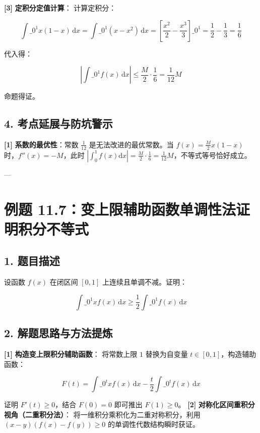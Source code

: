 \documentclass[11pt,a4paper,UTF8]{ctexart}
\begin{document}
\begin{solbox}[分步推导与答题规范]
\textbf{[3]}  \textbf{定积分定值计算}：
计算定积分：

\begin{equation*}
\int\_0^1 x(1-x)\,\mathrm{d}x = \int\_0^1 (x - x^2)\,\mathrm{d}x = \left[ \frac{x^2}{2} - \frac{x^3}{3} \right]\_0^1 = \frac{1}{2} - \frac{1}{3} = \frac{1}{6}
\end{equation*}

代入得：

\begin{equation*}
\left| \int\_0^1 f(x)\,\mathrm{d}x \right| \le \frac{M}{2} \cdot \frac{1}{6} = \frac{1}{12}M
\end{equation*}

命题得证。
\end{solbox}


\subsection{4. 考点延展与防坑警示}
\begin{solbox}[分步推导与答题规范]
\textbf{[1]}  \textbf{系数的最优性}：常数 $\frac{1}{12}$ 是无法改进的最优常数。当 $f(x) = \frac{M}{2}x(1-x)$ 时，$f''(x) = -M$，此时 $|\int_0^1 f(x)\mathrm{d}x| = \frac{M}{2} \cdot \frac{1}{6} = \frac{1}{12}M$，不等式等号恰好成立。
\end{solbox}

---


\section{例题 11.7：变上限辅助函数单调性法证明积分不等式}


\subsection{1. 题目描述}
设函数 $f(x)$ 在闭区间 $[0, 1]$ 上连续且单调不减。证明：

\begin{equation*}
\int\_0^1 x f(x)\,\mathrm{d}x \ge \frac{1}{2}\int\_0^1 f(x)\,\mathrm{d}x
\end{equation*}



\subsection{2. 解题思路与方法提炼}
\begin{solbox}[分步推导与答题规范]
\textbf{[1]}  \textbf{构造变上限积分辅助函数}：
将常数上限 $1$ 替换为自变量 $t \in [0, 1]$，构造辅助函数：

\begin{equation*}
F(t) = \int\_0^t x f(x)\,\mathrm{d}x - \frac{t}{2}\int\_0^t f(x)\,\mathrm{d}x
\end{equation*}

证明 $F'(t) \ge 0$，结合 $F(0)=0$ 即可推出 $F(1) \ge 0$。
\textbf{[2]}  \textbf{对称化区间重积分视角（二重积分法）}：
将一维积分乘积化为二重对称积分，利用 $(x-y)(f(x)-f(y)) \ge 0$ 的单调性代数结构瞬时获证。
\end{solbox}
\end{document}
